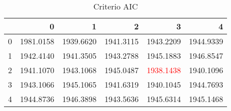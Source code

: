 \begin{table}[H]
\label{tab:autoarima_aic}
\centering
\begin{tabular}{lrrrrr}
\toprule
 & 0 & 1 & 2 & 3 & 4 \\
\midrule
0 & 1981.0158 & 1939.6620 & 1941.3115 & 1943.2209 & 1944.9339 \\
1 & 1942.4140 & 1941.3505 & 1943.2788 & 1945.1883 & 1946.8547 \\
2 & 1941.1070 & 1943.1068 & 1945.0487 & \textcolor{red}{1938.1438} & 1940.1096 \\
3 & 1943.1066 & 1945.1065 & 1941.6319 & 1940.1045 & 1944.7693 \\
4 & 1944.8736 & 1946.3898 & 1943.5636 & 1945.6314 & 1945.1468 \\
\bottomrule
\end{tabular}
\caption{Criterio AIC}
\end{table}
